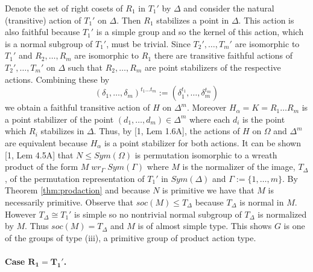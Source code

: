 \documentclass[]{article}
\theoremstyle{definition}
\begin{document}
Denote the set of right cosets of $R_1$ in $T_1'$ by $\Delta$ and consider the natural (transitive) action of $T_1'$ on $\Delta$. Then $R_1$ stabilizes a point in $\Delta$. This action is also faithful because $T_1'$ is a simple group and so the kernel of this action, which is a normal subgroup of $T_1'$, must be trivial. Since $T_2',\dots,T_m'$ are isomorphic to $T_1'$ and $R_2,\dots,R_m$ are isomorphic to $R_1$ there are transitive faithful actions of $T_2',\dots,T_m'$ on $\Delta$ such that $R_2,\dots,R_m$ are point stabilizers of the respective actions. Combining these by $$(\delta_1,\dots,\delta_m)^{t_1\dots t_m}:= (\delta_1^{t_1},\dots,\delta_m^{t_m})$$
we obtain a faithful transitive action of $H$ on $\Delta^m$. Moreover $H_\alpha = K = R_1\dots R_m$ is a point stabilizer of the point $(d_1,\dots,d_m) \in \Delta^m$ where each $d_i$ is the point which $R_i$ stabilizes in $\Delta$. Thus, by [1, Lem 1.6A], the actions of $H$ on $\Omega$ and $\Delta^m$ are equivalent because $H_\alpha$ is a point stabilizer for both actions. It can be shown [1, Lem 4.5A] that $N \leqslant Sym(\Omega)$ is permutation isomorphic to a wreath product of the form $M \; wr_\Gamma \; Sym(\Gamma)$ where $M$ is the normalizer of the image, $T_\Delta$, of the permutation representation of $T_1'$ in $Sym(\Delta)$ and $\Gamma:=\{1,\dots,m\}$. By Theorem \ref{thm:prodaction} and because $N$ is primitive we have that $M$ is necessarily primitive. Observe that $soc(M) \leqslant T_\Delta$ because $T_\Delta$ is normal in $M$. However $T_\Delta\cong T_1'$ is simple so no nontrivial normal subgroup of $T_\Delta$ is normalized by $M$. Thus $soc(M) = T_\Delta$ and $M$ is of almost simple type. This shows $G$ is one of the groups of type (iii), a primitive group of product action type.\\
\\
\textbf{Case $\mathbf{R_1=T_1'}$.}\\
\end{document}
